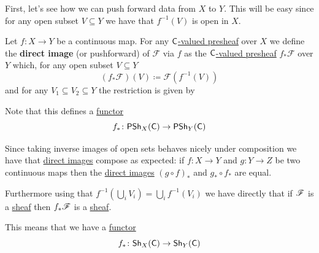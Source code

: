 \documentclass[../../main]{subfiles}
\begin{document}
First, let's see how we can push forward data from \(X\) to \(Y\).
This will be easy since for any open subset \(V \subseteq Y\) we have that \(f^{-1}(V)\) is open in \(X\).
\begin{definition}\label{def:direct-image-sheaf}
  Let \(f\colon X \to Y\) be a continuous map.
  For any \hyperref[def:presheaf]{\(\mathsf{C}\)-valued presheaf} over \(X\) we define the \textbf{direct image} (or pushforward) of \(\mathcal{F}\) via \(f\) as the \hyperref[def:presheaf]{\(\mathsf{C}\)-valued presheaf} \(f_{\ast}\mathcal{F}\) over \(Y\) which, for any open subset \(V \subseteq Y\)
  \begin{equation*}
    \left(f_{\ast}\mathcal{F}\right)(V) \coloneq \mathcal{F}(f^{-1}(V))
  \end{equation*}
  and for any \(V_{1} \subseteq V_{2} \subseteq Y\) the restriction is given by
  \begin{center}
  \end{center}

  Note that this defines a \hyperref[def:functor]{functor}
  \begin{equation*}
    f_{\ast}\colon \mathsf{PSh}_{X}(\mathsf{C}) \to \mathsf{PSh}_{Y}(\mathsf{C})
  \end{equation*}
\end{definition}

Since taking inverse images of open sets behaves nicely under composition we have that \hyperref[def:direct-image-sheaf]{direct images} compose as expected: if \(f\colon X \to Y\) and \(g: Y \to Z\) be two continuous maps then the \hyperref[def:direct-image-sheaf]{direct images} \((g \circ f)_{\ast}\) and \(g_{\ast} \circ f_{\ast}\) are equal.

Furthermore using that \(f^{-1}(\bigcup_{i} V_{i}) = \bigcup_{i} f^{-1}(V_{i})\) we have directly that if \(\mathscr{F}\) is a \hyperref[def:sheaf]{sheaf} then \(f_{\ast}\mathscr{F}\) is a \hyperref[def:sheaf]{sheaf}.

This means that we have a \hyperref[def:functor]{functor}
\begin{equation*}
  f_{\ast}\colon \mathsf{Sh}_{X}(\mathsf{C}) \to \mathsf{Sh}_{Y}(\mathsf{C})
\end{equation*}
\end{document}
